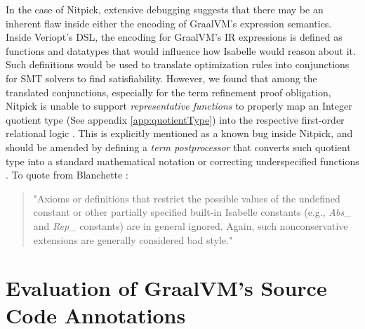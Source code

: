 In the case of Nitpick, extensive debugging suggests that there may be an inherent flaw inside either the encoding of GraalVM's expression semantics.
Inside Veriopt's DSL, the encoding for GraalVM's IR expressions is defined as functions and datatypes that would influence how Isabelle would 
reason about it. Such definitions would be used to translate optimization rules into conjunctions for SMT solvers to find satisfiability.
However, we found that among the translated conjunctions, especially for the term refinement proof obligation, 
Nitpick is unable to support \emph{representative functions} to properly map an Integer quotient type (See appendix \ref{app:quotientType}) 
into the respective first-order relational logic \cite[Ch. 8]{isabelleNitpick}. This is explicitly mentioned as a known bug inside Nitpick, 
and should be amended by defining a \emph{term postprocessor} that converts such quotient type into a standard mathematical notation 
\cite[Sec. 3.7]{isabelleNitpick} or correcting underspecified functions \cite[Ch. 8]{isabelleNitpick}. 
To quote from Blanchette \cite[Ch. 8]{isabelleNitpick}:

\begin{quote}
    "Axioms or definitions that restrict the possible values of the undefined
    constant or other partially specified built-in Isabelle constants (e.g.,
    \emph{Abs\_} and \emph{Rep\_} constants) are in general ignored. Again, such nonconservative extensions are generally considered bad style."
\end{quote}

\section{Evaluation of GraalVM's Source Code Annotations}


\lipsum[1]
